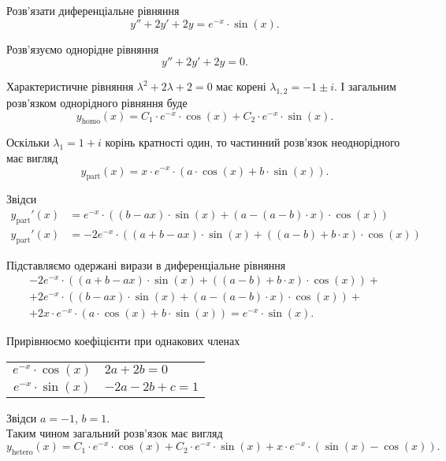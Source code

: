 \begin{example}
	Розв’язати диференціальне рівняння \[y'' + 2 y' + 2 y = e^{-x} \cdot \sin (x).\]
\end{example}
\begin{solution}
	Розв’язуємо однорідне рівняння
	\begin{equation*}
		y'' + 2 y' + 2y = 0.
	\end{equation*}

	Характеристичне рівняння $\lambda^2 + 2 \lambda + 2 = 0$ має корені $\lambda_{1,2} = -1\pm i$. І загальним розв’язком однорідного рівняння буде
	\begin{equation*}
		y_{\text{homo}}(x) = C_1 \cdot e^{-x} \cdot \cos(x) + C_2 \cdot e^{-x} \cdot \sin(x).
	\end{equation*}

	Оскільки $\lambda_1 = 1 + i$ корінь кратності один, то частинний роз\-в'яз\-ок неоднорідного має вигляд
	\begin{equation*}
		y_{\text{part}}(x) = x \cdot e^{-x} \cdot (a \cdot \cos(x) + b \cdot \sin(x)).
	\end{equation*}

	Звідси
	\begin{align*}
		y_{\text{part}}'(x) &= e^{-x} \cdot ((b - a x) \cdot \sin(x) + (a - (a - b) \cdot x) \cdot \cos(x)) \\
		y_{\text{part}}'(x) &= -2 e^{-x} \cdot ((a + b - a x) \cdot \sin(x) + ((a - b) + b \cdot x) \cdot \cos(x))
	\end{align*}

	Підставляємо одержані вирази в диференціальне рівняння
	\begin{multline*}
		-2 e^{-x} \cdot ((a + b - a x) \cdot \sin(x) + ((a - b) + b \cdot x) \cdot \cos(x)) + \\ + 2 e^{-x} \cdot ((b - a x) \cdot \sin(x) + (a - (a - b) \cdot x) \cdot \cos(x)) + \\ + 2 x \cdot e^{-x} \cdot (a \cdot \cos(x) + b \cdot \sin(x)) = e^{-x} \cdot \sin(x). 
	\end{multline*}

	Прирівнюємо коефіцієнти при однакових членах
	\begin{table}[H]
		\centering
		\begin{tabular}{c|l}
			$e^{-x} \cdot \cos(x)$ & $2a + 2b = 0$ \\
			$e^{-x} \cdot \sin(x)$ & $-2 a - 2 b + c = 1$
		\end{tabular}
	\end{table}

	Звідси $a = -1$, $b = 1$. \\

	Таким чином загальний розв’язок має вигляд
	\begin{equation*}
		y_{\text{hetero}}(x) = C_1 \cdot e^{-x} \cdot \cos(x) + C_2 \cdot e^{-x} \cdot \sin(x) + x \cdot e^{-x} \cdot \left( \sin(x) - \cos(x) \right).
	\end{equation*}
\end{solution}

